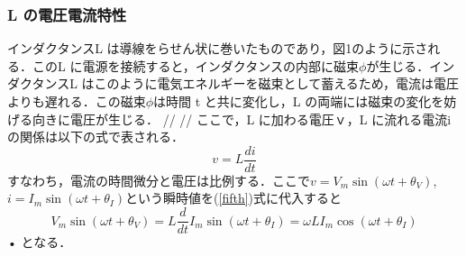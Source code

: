 \documentclass{ujarticle}
\begin{document}
\subsubsection{L の電圧電流特性}
インダクタンスL は導線をらせん状に巻いたものであり，図1のように示される．このL に電源を接続すると，インダクタンスの内部に磁束$\phi$が生じる．インダクタンスL はこのように電気エネルギーを磁束として蓄えるため，電流は電圧よりも遅れる．この磁束$\phi$は時間 t と共に変化し，L の両端には磁束の変化を妨げる向きに電圧が生じる．
//
//
ここで，L に加わる電圧ｖ，L に流れる電流i の関係は以下の式で表される．
\begin{equation}
\label{fifth}
v = L\frac{di}{dt}
\end{equation}
すなわち，電流の時間微分と電圧は比例する．ここで$v = V_{m}\sin(\omega t + \theta_{V})$,$i = I_{m}\sin(\omega t + \theta_{I})$という瞬時値を(\ref{fifth})式に代入すると
\begin{equation}
\label{sixth}
V_{m}\sin(\omega t + \theta_{V})=L\frac{d}{dt} {I_{m}\sin(\omega t + \theta_{I}) } = \omega LI_{m}\cos(\omega t + \theta_{I})
\end{equation}•
となる．
\end{document}
